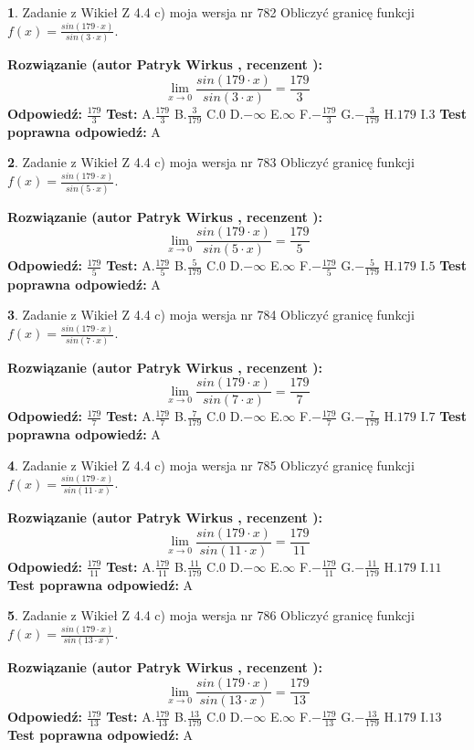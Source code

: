\documentclass[12pt, a4paper]{article}
\theoremstyle{definition} %
\newtheorem{zad}{}
\newcommand{\zadStart}[1]{\begin{zad}#1\newline}
\newcommand{\zadStop}{\end{zad}}
\newcommand{\rozwStart}[2]{\noindent \textbf{Rozwiązanie (autor #1 , recenzent #2): }\newline}
\newcommand{\rozwStop}{\newline}
\newcommand{\odpStart}{\noindent \textbf{Odpowiedź:}\newline}
\newcommand{\odpStop}{\newline}
\newcommand{\testStart}{\noindent \textbf{Test:}\newline}
\newcommand{\testStop}{\newline}
\newcommand{\kluczStart}{\noindent \textbf{Test poprawna odpowiedź:}\newline}
\newcommand{\kluczStop}{\newline}
\begin{document}
\zadStart{Zadanie z Wikieł Z 4.4 c) moja wersja nr 782}
Obliczyć granicę funkcji $f(x)=\frac{sin(179\cdot x)}{sin(3\cdot x)}$.
\zadStop
\rozwStart{Patryk Wirkus}{}
$$\lim\limits_{x\to 0}\frac{sin(179\cdot x)}{sin(3\cdot x)}=
\frac{179}{3}$$
\rozwStop
\odpStart
$\frac{179}{3}$
\odpStop
\testStart
A.$\frac{179}{3}$
B.$\frac{3}{179}$
C.$0$
D.$-\infty$
E.$\infty$
F.$-\frac{179}{3}$
G.$-\frac{3}{179}$
H.$179$
I.$3$
\testStop
\kluczStart
A
\kluczStop



\zadStart{Zadanie z Wikieł Z 4.4 c) moja wersja nr 783}
Obliczyć granicę funkcji $f(x)=\frac{sin(179\cdot x)}{sin(5\cdot x)}$.
\zadStop
\rozwStart{Patryk Wirkus}{}
$$\lim\limits_{x\to 0}\frac{sin(179\cdot x)}{sin(5\cdot x)}=
\frac{179}{5}$$
\rozwStop
\odpStart
$\frac{179}{5}$
\odpStop
\testStart
A.$\frac{179}{5}$
B.$\frac{5}{179}$
C.$0$
D.$-\infty$
E.$\infty$
F.$-\frac{179}{5}$
G.$-\frac{5}{179}$
H.$179$
I.$5$
\testStop
\kluczStart
A
\kluczStop



\zadStart{Zadanie z Wikieł Z 4.4 c) moja wersja nr 784}
Obliczyć granicę funkcji $f(x)=\frac{sin(179\cdot x)}{sin(7\cdot x)}$.
\zadStop
\rozwStart{Patryk Wirkus}{}
$$\lim\limits_{x\to 0}\frac{sin(179\cdot x)}{sin(7\cdot x)}=
\frac{179}{7}$$
\rozwStop
\odpStart
$\frac{179}{7}$
\odpStop
\testStart
A.$\frac{179}{7}$
B.$\frac{7}{179}$
C.$0$
D.$-\infty$
E.$\infty$
F.$-\frac{179}{7}$
G.$-\frac{7}{179}$
H.$179$
I.$7$
\testStop
\kluczStart
A
\kluczStop



\zadStart{Zadanie z Wikieł Z 4.4 c) moja wersja nr 785}
Obliczyć granicę funkcji $f(x)=\frac{sin(179\cdot x)}{sin(11\cdot x)}$.
\zadStop
\rozwStart{Patryk Wirkus}{}
$$\lim\limits_{x\to 0}\frac{sin(179\cdot x)}{sin(11\cdot x)}=
\frac{179}{11}$$
\rozwStop
\odpStart
$\frac{179}{11}$
\odpStop
\testStart
A.$\frac{179}{11}$
B.$\frac{11}{179}$
C.$0$
D.$-\infty$
E.$\infty$
F.$-\frac{179}{11}$
G.$-\frac{11}{179}$
H.$179$
I.$11$
\testStop
\kluczStart
A
\kluczStop



\zadStart{Zadanie z Wikieł Z 4.4 c) moja wersja nr 786}
Obliczyć granicę funkcji $f(x)=\frac{sin(179\cdot x)}{sin(13\cdot x)}$.
\zadStop
\rozwStart{Patryk Wirkus}{}
$$\lim\limits_{x\to 0}\frac{sin(179\cdot x)}{sin(13\cdot x)}=
\frac{179}{13}$$
\rozwStop
\odpStart
$\frac{179}{13}$
\odpStop
\testStart
A.$\frac{179}{13}$
B.$\frac{13}{179}$
C.$0$
D.$-\infty$
E.$\infty$
F.$-\frac{179}{13}$
G.$-\frac{13}{179}$
H.$179$
I.$13$
\testStop
\kluczStart
A
\kluczStop
\end{document}
